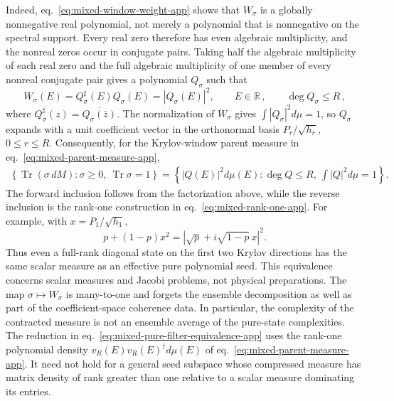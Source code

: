 \documentclass[a4paper,11pt]{article}
\def\dd{d}%
\def\ii{i}%
\theoremstyle{definition}
\theoremstyle{remark}
\newcommand{\dd}{\mathrm d}
\newcommand{\ii}{\mathrm i}
\newcommand{\RR}{\mathbb R}
\begin{document}
Indeed, eq.~\eqref{eq:mixed-window-weight-app} shows that $W_\sigma$ is
a globally nonnegative real polynomial, not merely a polynomial that is
nonnegative on the spectral support. Every real zero therefore has even
algebraic multiplicity, and the nonreal zeros occur in conjugate pairs.
Taking half the algebraic multiplicity of each real zero and the full
algebraic multiplicity of one member of every nonreal conjugate pair
gives a polynomial $Q_\sigma$ such that
\begin{equation}
   W_\sigma(E)=Q_\sigma^\sharp(E)Q_\sigma(E)
   =|Q_\sigma(E)|^2,\qquad E\in\RR\,,
   \qquad
   \deg Q_\sigma\le R\,,
   \label{eq:mixed-spectral-factor-app}
\end{equation}
where
$Q_\sigma^\sharp(z)=\overline{Q_\sigma(\bar z)}$.
The normalization of $W_\sigma$ gives
$\int|Q_\sigma|^2\dd\mu=1$, so $Q_\sigma$ expands with a unit
coefficient vector in the orthonormal basis
$P_r/\sqrt{h_r}$, $0\le r\le R$. Consequently, for the
Krylov-window parent measure in eq.~\eqref{eq:mixed-parent-measure-app},
\begin{equation}
\begin{aligned}
   \left\{
      \operatorname{Tr}(\sigma\,\dd M):
      \sigma\ge0,\ \operatorname{Tr}\sigma=1
   \right\}
   =
   \left\{
      |Q(E)|^2\dd\mu(E):
      \deg Q\le R,\ \int|Q|^2\dd\mu=1
   \right\}.
\end{aligned}
   \label{eq:mixed-pure-filter-equivalence-app}
\end{equation}
The forward inclusion follows from the factorization above, while the
reverse inclusion is the rank-one construction in
eq.~\eqref{eq:mixed-rank-one-app}.  For example, with
$x=P_1/\sqrt{h_1}$,
\begin{equation}
   p+(1-p)x^2
   =\left|\sqrt p+\ii\sqrt{1-p}\,x\right|^2.
\end{equation}
Thus even a full-rank diagonal state on the first two Krylov directions
has the same scalar measure as an effective pure polynomial seed.  This
equivalence concerns scalar measures and Jacobi problems, not physical
preparations.  The map $\sigma\mapsto W_\sigma$ is
many-to-one and forgets the ensemble decomposition as well as part of
the coefficient-space coherence data.  In particular, the complexity
of the contracted measure is not an ensemble average of the pure-state
complexities.  The reduction in
eq.~\eqref{eq:mixed-pure-filter-equivalence-app} uses the rank-one
polynomial density
$v_R(E)v_R(E)^\dagger\dd\mu(E)$ of
eq.~\eqref{eq:mixed-parent-measure-app}. It need not hold for a general
seed subspace whose compressed measure has matrix density of rank
greater than one relative to a scalar measure dominating its entries.
\end{document}

